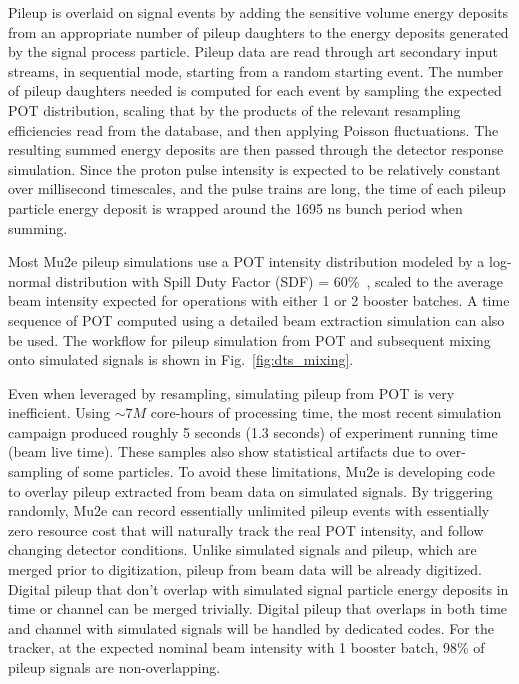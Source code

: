 Pileup is overlaid on signal events by adding the sensitive volume energy deposits from an appropriate number of pileup daughters to the energy deposits generated by the signal process particle. Pileup data are read through art secondary input streams, in sequential mode, starting from a random starting event.
The number of pileup daughters needed is computed for each event by sampling the expected POT distribution, scaling that by the products of the relevant resampling efficiencies read from the database, and then applying Poisson fluctuations. The resulting summed energy deposits are then passed through the detector response simulation. Since the proton pulse intensity is expected to be relatively constant over millisecond timescales, and the pulse trains are long, the time of each pileup particle energy deposit is wrapped around the 1695 ns bunch period when summing.

Most Mu2e pileup simulations use a POT intensity distribution modeled by a log-normal distribution with Spill Duty Factor (SDF) = 60\%~\cite{Mu2e:2022ggl}, scaled to the average beam intensity expected for operations with either 1 or 2 booster batches. A time sequence of POT computed using a detailed beam extraction simulation can also be used.
The workflow for pileup simulation from POT and subsequent mixing onto simulated signals is shown in Fig.~\ref{fig:dts_mixing}.

Even when leveraged by resampling, simulating pileup from POT is very inefficient. Using $\sim7M$  core-hours of processing time, the most recent simulation campaign produced roughly 5 seconds (1.3 seconds) of experiment running time (beam live time). These samples also show statistical artifacts due to over-sampling of some particles. To avoid these limitations, Mu2e is developing code to overlay pileup extracted from beam data on simulated signals. By triggering randomly, Mu2e can record essentially unlimited pileup events with essentially zero resource cost that will naturally track the real POT intensity, and follow changing detector conditions. Unlike simulated signals and pileup, which are merged prior to digitization, pileup from beam data will be already digitized. Digital pileup that don't overlap with simulated signal particle energy deposits in time or channel can be merged trivially. Digital pileup that overlaps in both time and channel with simulated signals will be handled by dedicated codes. For the tracker, at the expected nominal beam intensity with 1 booster batch, 98\% of pileup signals are non-overlapping. 


